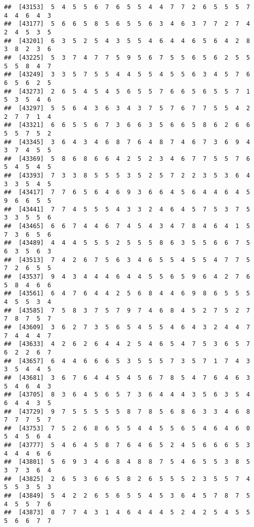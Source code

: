 \documentclass[
]{book}
\begin{document}
\begin{verbatim}
##  [43153]  5  4  5  5  6  7  6  5  5  4  4  7  7  2  6  5  5  5  7  4  4  6  4  3
##  [43177]  5  6  6  5  8  5  6  5  5  6  3  4  6  3  7  7  2  7  4  2  4  5  3  5
##  [43201]  6  3  5  2  5  4  3  5  5  4  6  4  4  6  5  6  4  2  8  3  8  2  3  6
##  [43225]  5  3  7  4  7  7  5  9  5  6  7  5  5  6  5  6  2  5  5  5  5  8  4  7
##  [43249]  3  3  5  7  5  5  4  4  5  5  4  5  5  6  3  4  5  7  6  6  5  6  2  5
##  [43273]  2  6  5  4  5  4  5  6  5  5  7  6  6  5  6  5  5  7  1  5  3  5  4  6
##  [43297]  5  5  6  4  3  6  3  4  3  7  5  7  6  7  7  5  5  4  2  2  7  7  1  4
##  [43321]  6  6  5  5  6  7  3  6  6  3  5  6  6  5  8  6  2  6  6  5  5  7  5  2
##  [43345]  3  6  4  3  4  6  8  7  6  4  8  7  4  6  7  3  6  9  4  3  7  4  5  5
##  [43369]  5  8  6  8  6  6  4  2  5  2  3  4  6  7  7  5  5  7  6  5  4  5  4  5
##  [43393]  7  3  3  8  5  5  5  3  5  2  5  7  2  2  3  5  3  6  4  3  3  5  4  5
##  [43417]  7  7  6  5  6  4  6  9  3  6  6  4  5  6  4  4  6  4  5  9  6  6  5  5
##  [43441]  7  7  4  5  5  5  4  3  3  2  4  6  4  5  7  5  3  7  5  3  3  5  5  6
##  [43465]  6  6  7  4  4  6  7  4  5  4  3  4  7  8  4  6  4  1  5  7  3  6  5  6
##  [43489]  4  4  4  5  5  5  2  5  5  5  8  6  3  5  5  6  6  7  5  6  3  5  6  3
##  [43513]  7  4  2  6  7  5  6  3  4  6  5  5  4  5  5  4  7  7  5  7  2  6  5  5
##  [43537]  9  4  3  4  4  4  6  4  4  5  5  6  5  9  6  4  2  7  6  5  8  4  6  6
##  [43561]  6  4  7  6  4  4  2  5  6  8  4  4  6  9  8  6  5  5  5  4  5  5  3  4
##  [43585]  7  5  8  3  7  5  7  9  7  4  6  8  4  5  2  7  5  2  7  7  8  7  5  7
##  [43609]  3  6  2  7  3  5  6  5  4  5  5  4  6  4  3  2  4  4  7  7  4  4  4  7
##  [43633]  4  2  6  2  6  4  4  2  5  4  6  5  4  7  5  3  6  5  7  6  2  2  6  7
##  [43657]  6  4  4  6  6  6  5  3  5  5  5  7  3  5  7  1  7  4  3  3  5  4  4  5
##  [43681]  3  6  7  6  4  4  5  4  5  6  7  8  5  4  7  6  4  6  3  5  4  6  4  3
##  [43705]  8  3  6  4  5  6  5  7  3  6  4  4  4  3  5  6  3  5  4  6  4  4  3  5
##  [43729]  9  7  5  5  5  5  5  8  7  8  5  6  8  6  3  3  4  6  8  7  7  7  5  7
##  [43753]  7  5  2  6  8  6  5  5  4  4  5  5  6  5  4  6  4  6  0  5  4  5  6  4
##  [43777]  5  4  6  4  5  8  7  6  4  6  5  2  4  5  6  6  6  5  3  4  4  4  6  6
##  [43801]  5  6  9  3  4  6  8  4  8  8  7  5  4  6  5  5  3  8  5  3  7  3  6  4
##  [43825]  2  6  5  3  6  6  5  8  2  6  5  5  5  2  3  5  5  7  4  5  5  3  5  3
##  [43849]  5  4  2  2  6  5  6  5  5  4  5  3  6  4  5  7  8  7  5  4  5  5  7  6
##  [43873]  8  7  7  4  3  1  4  6  4  4  4  5  2  4  2  5  4  5  5  5  6  6  7  7

\end{verbatim}
\end{document}
